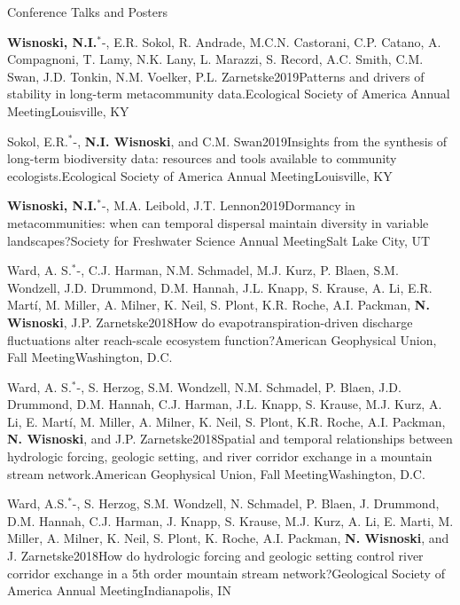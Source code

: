 \documentclass{resume} %
\newcommand{\Star}{\ensuremath{^*}\kern-\scriptspace}
\begin{document}
\begin{rhangSection}{Conference Talks and Posters}
\begin{Presentation}{{\bf Wisnoski, N.I.}\Star, E.R. Sokol, R. Andrade, M.C.N. Castorani, C.P. Catano, A. Compagnoni, T. Lamy, N.K. Lany, L. Marazzi, S. Record, A.C. Smith, C.M. Swan, J.D. Tonkin, N.M. Voelker, P.L. Zarnetske}{2019}{Patterns and drivers of stability in long-term metacommunity data.}{Ecological Society of America Annual Meeting}{Louisville, KY}
\end{Presentation}
  
\begin{Presentation}{Sokol, E.R.\Star, {\bf N.I. Wisnoski}, and C.M. Swan}{2019}{Insights from the synthesis of long-term biodiversity data: resources and tools available to community ecologists.}{Ecological Society of America Annual Meeting}{Louisville, KY}
\end{Presentation}
  
\begin{Presentation}{{\bf Wisnoski, N.I.}\Star, M.A. Leibold, J.T. Lennon}{2019}{Dormancy in metacommunities: when can temporal dispersal maintain diversity in variable landscapes?}{Society for Freshwater Science Annual Meeting}{Salt Lake City, UT}
\end{Presentation}
  
\begin{Presentation}{Ward, A. S.\Star, C.J. Harman, N.M. Schmadel, M.J. Kurz, P. Blaen, S.M. Wondzell, J.D. Drummond, D.M. Hannah, J.L. Knapp, S. Krause, A. Li, E.R. Martí, M. Miller, A. Milner, K. Neil, S. Plont, K.R. Roche, A.I. Packman, {\bf N. Wisnoski}, J.P. Zarnetske}{2018}{How do evapotranspiration-driven discharge fluctuations alter reach-scale ecosystem function?}{American Geophysical Union, Fall Meeting}{Washington, D.C.}
\end{Presentation}
  
\begin{Presentation}{Ward, A. S.\Star, S. Herzog, S.M. Wondzell, N.M. Schmadel, P. Blaen, J.D. Drummond, D.M. Hannah, C.J. Harman, J.L. Knapp, S. Krause, M.J. Kurz, A. Li, E. Martí, M. Miller, A. Milner, K. Neil, S. Plont, K.R. Roche, A.I. Packman, {\bf N. Wisnoski}, and J.P. Zarnetske}{2018}{Spatial and temporal relationships between hydrologic forcing, geologic setting, and river corridor exchange in a mountain stream network.}{American Geophysical Union, Fall Meeting}{Washington, D.C.}
\end{Presentation}
  
\begin{Presentation}{Ward, A.S.\Star, S. Herzog, S.M. Wondzell, N. Schmadel, P. Blaen, J. Drummond, D.M. Hannah, C.J. Harman, J. Knapp, S. Krause, M.J. Kurz, A. Li, E. Marti, M. Miller, A. Milner, K. Neil, S. Plont, K. Roche, A.I. Packman, {\bf N. Wisnoski}, and J. Zarnetske}{2018}{How do hydrologic forcing and geologic setting control river corridor exchange in a 5th order mountain stream network?}{Geological Society of America Annual Meeting}{Indianapolis, IN}
\end{Presentation}
  

\end{rhangSection}
\end{document}

